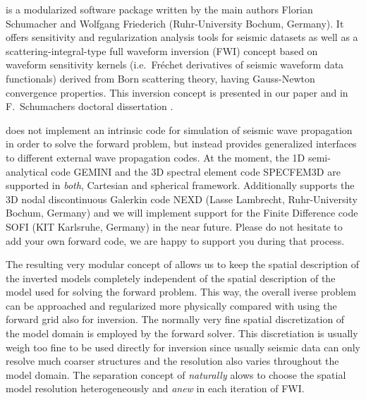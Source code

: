 
%
%
%
\ASKI is a modularized software package written by the main authors Florian Schumacher and
Wolfgang Friederich (Ruhr-University Bochum, Germany). It offers sensitivity and regularization 
analysis tools for seismic datasets
as well as a scattering-integral-type full waveform inversion (FWI) concept based on waveform sensitivity 
kernels (i.e.\ Fr\'echet derivatives of seismic waveform data functionals) derived from Born scattering theory,
having Gauss-Newton convergence properties.
This inversion concept is presented in our paper \cite{Schumacher16} and in F.\  Schumachers doctoral
dissertation \cite{_743d334d-dfa4-4a16-8cc5-91cdadc95271}.

\ASKI does not implement an intrinsic code for simulation of seismic wave propagation in order to 
solve the forward problem, but instead provides generalized interfaces to different external wave 
propagation codes. At the moment, the 1D semi-analytical code GEMINI \cite{friederich_wd1995} and the 3D spectral 
element code SPECFEM3D \cite{TrKoLi08} are supported in \emph{both}, Cartesian and spherical framework. 
Additionally \ASKI supports the 3D nodal discontinuous Galerkin code NEXD (Lasse Lambrecht, Ruhr-University 
Bochum, Germany) and we will implement support for the Finite Difference code SOFI (KIT Karlsruhe, Germany)
in the near future. 
Please do not hesitate to add your own forward code, we are happy to support you during that process.

The resulting very modular concept of \ASKI allows us to keep the spatial description of the inverted 
models completely independent of the spatial description of the model used for solving the forward 
problem. This way, the overall iverse problem can be approached and regularized more physically compared
with using the forward grid also for inversion. The normally very fine spatial discretization of the model
domain is employed by the forward solver. This discretiation is usually weigh too fine to be used
directly for inversion since usually seismic data can only resolve much coarser structures and the
resolution also varies throughout the model domain. 
The separation concept of \ASKI \emph{naturally} alows to choose the spatial model
resolution heterogeneously and \emph{anew} in each iteration of FWI.

